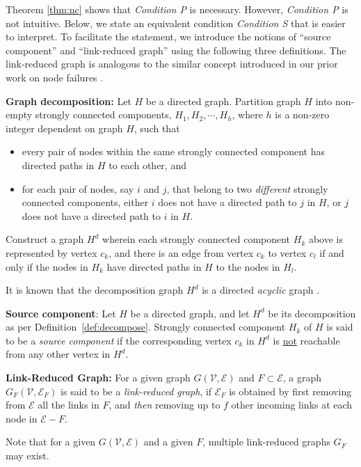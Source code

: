 \documentclass{llncs}
\newcommand{\scripte}{\mathcal{E}}
\newcommand{\scriptv}{\mathcal{V}}
\begin{document}
Theorem \ref{thm:nc} shows that {\em Condition P} is necessary. However, {\em Condition P} is not intuitive. Below, we state an equivalent condition {\em Condition S} that is
easier to interpret. To facilitate the
statement, we introduce the notions of ``source component'' and ``link-reduced graph'' using the following three definitions. The link-reduced graph is analogous to the similar concept introduced in our prior work on node failures \cite{vaidya_PODC12,Tseng_general,vaidya_icdcn14}. 

\begin{definition}
\label{def:decompose}
{\bf Graph decomposition:}
Let $H$ be a directed graph. Partition graph $H$ into non-empty strongly connected components,
$H_1,H_2,\cdots,H_h$, where $h$ is a non-zero integer dependent on graph $H$,
such that
\begin{itemize}
\item every pair of nodes {within} the same strongly connected component has directed
paths in $H$ to each other, and
\item for each pair of nodes, say $i$ and $j$, that belong to
two {\em different} strongly connected components, either $i$ does not have a
directed path to $j$ in $H$, or $j$ does not have a directed path to $i$ in $H$.
\end{itemize}
Construct a graph $H^d$ wherein each strongly connected component $H_k$ above is represented
by vertex $c_k$, and there is an edge from vertex $c_k$ to vertex $c_l$ if and only if
the nodes in $H_k$ have directed paths in $H$ to the nodes in $H_l$.
\end{definition}
It is known that the decomposition
graph $H^d$ is a directed {\em acyclic} graph \cite{dag_decomposition}.

\begin{definition}
{\bf Source component}:
Let $H$ be a directed graph, and let $H^d$ be its decomposition as per
Definition~\ref{def:decompose}. 
Strongly connected component $H_k$ of $H$ is said to be a {\em source component}
if the corresponding vertex $c_k$ in $H^d$ is \underline{not} reachable from any
other vertex in $H^d$. 
\end{definition}

\begin{definition}
\label{def:reduced} {\bf Link-Reduced Graph:}
For a given graph $G(\scriptv,\scripte)$ and $F\subset\scripte$,
a graph $G_F(\scriptv,\scripte_F)$
is said to be a {\em link-reduced graph}, if
$\scripte_F$ is obtained by first removing from $\scripte$ all the links in $F$, and {\em then} removing up to $f$ other incoming
links at each node in $\scripte - F$.
\end{definition}
Note that for a given $G(\scriptv,\scripte)$ and a given $F$,
multiple link-reduced graphs $G_F$ may exist. \\
\end{document}
